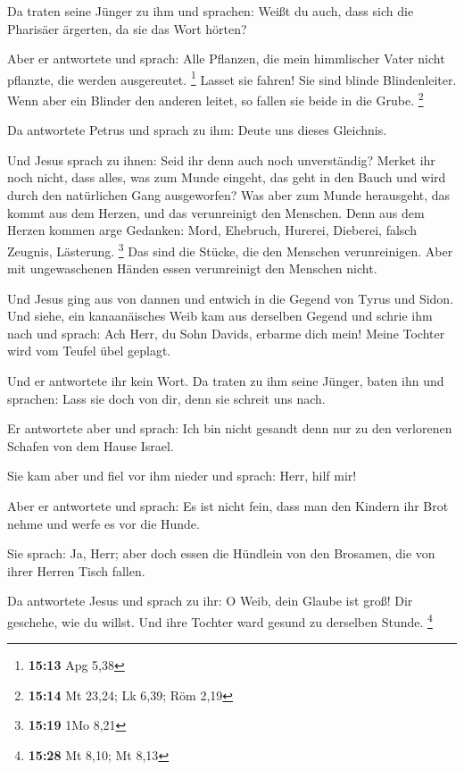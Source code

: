  Da traten seine Jünger zu ihm und sprachen: Weißt du auch,
dass sich die Pharisäer ärgerten, da sie das Wort hörten?

 Aber er antwortete und sprach: Alle Pflanzen, die mein
himmlischer Vater nicht pflanzte, die werden ausgereutet. \footnote{\textbf{15:13}
  Apg 5,38}  Lasset sie fahren! Sie sind blinde
Blindenleiter. Wenn aber ein Blinder den anderen leitet, so fallen sie
beide in die Grube. \footnote{\textbf{15:14} Mt 23,24; Lk 6,39; Röm 2,19}

 Da antwortete Petrus und sprach zu ihm: Deute uns dieses
Gleichnis.

 Und Jesus sprach zu ihnen: Seid ihr denn auch noch
unverständig?  Merket ihr noch nicht, dass alles, was zum
Munde eingeht, das geht in den Bauch und wird durch den natürlichen Gang
ausgeworfen?  Was aber zum Munde herausgeht, das kommt aus
dem Herzen, und das verunreinigt den Menschen.  Denn aus
dem Herzen kommen arge Gedanken: Mord, Ehebruch, Hurerei, Dieberei,
falsch Zeugnis, Lästerung. \footnote{\textbf{15:19} 1Mo 8,21}
 Das sind die Stücke, die den Menschen verunreinigen. Aber
mit ungewaschenen Händen essen verunreinigt den Menschen nicht.

 Und Jesus ging aus von dannen und entwich in die Gegend
von Tyrus und Sidon.  Und siehe, ein kanaanäisches Weib kam
aus derselben Gegend und schrie ihm nach und sprach: Ach Herr, du Sohn
Davids, erbarme dich mein! Meine Tochter wird vom Teufel übel geplagt.

 Und er antwortete ihr kein Wort. Da traten zu ihm seine
Jünger, baten ihn und sprachen: Lass sie doch von dir, denn sie schreit
uns nach.

 Er antwortete aber und sprach: Ich bin nicht gesandt denn
nur zu den verlorenen Schafen von dem Hause Israel.

 Sie kam aber und fiel vor ihm nieder und sprach: Herr,
hilf mir!

 Aber er antwortete und sprach: Es ist nicht fein, dass man
den Kindern ihr Brot nehme und werfe es vor die Hunde.

 Sie sprach: Ja, Herr; aber doch essen die Hündlein von den
Brosamen, die von ihrer Herren Tisch fallen.

 Da antwortete Jesus und sprach zu ihr: O Weib, dein Glaube
ist groß! Dir geschehe, wie du willst. Und ihre Tochter ward gesund zu
derselben Stunde. \footnote{\textbf{15:28} Mt 8,10; Mt 8,13}

